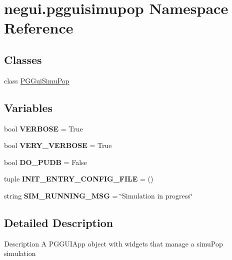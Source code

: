 \hypertarget{namespacenegui_1_1pgguisimupop}{}\section{negui.\+pgguisimupop Namespace Reference}
\label{namespacenegui_1_1pgguisimupop}
\subsection*{Classes}
\begin{DoxyCompactItemize}
\item 
class \hyperlink{classnegui_1_1pgguisimupop_1_1PGGuiSimuPop}{P\+G\+Gui\+Simu\+Pop}
\end{DoxyCompactItemize}
\subsection*{Variables}
\begin{DoxyCompactItemize}
\item 
bool {\bfseries V\+E\+R\+B\+O\+SE} = True\hypertarget{namespacenegui_1_1pgguisimupop_aab29eb6c6feb0d32b5d60b4eef930da9}{}\label{namespacenegui_1_1pgguisimupop_aab29eb6c6feb0d32b5d60b4eef930da9}

\item 
bool {\bfseries V\+E\+R\+Y\+\_\+\+V\+E\+R\+B\+O\+SE} = True\hypertarget{namespacenegui_1_1pgguisimupop_af283504b4edcb1ce9f987a021991a900}{}\label{namespacenegui_1_1pgguisimupop_af283504b4edcb1ce9f987a021991a900}

\item 
bool {\bfseries D\+O\+\_\+\+P\+U\+DB} = False\hypertarget{namespacenegui_1_1pgguisimupop_a7828b4058072779ad8f76eaa79a87952}{}\label{namespacenegui_1_1pgguisimupop_a7828b4058072779ad8f76eaa79a87952}

\item 
tuple {\bfseries I\+N\+I\+T\+\_\+\+E\+N\+T\+R\+Y\+\_\+\+C\+O\+N\+F\+I\+G\+\_\+\+F\+I\+LE} = ()\hypertarget{namespacenegui_1_1pgguisimupop_a0c62f73e78dad26e648483936e298140}{}\label{namespacenegui_1_1pgguisimupop_a0c62f73e78dad26e648483936e298140}

\item 
string {\bfseries S\+I\+M\+\_\+\+R\+U\+N\+N\+I\+N\+G\+\_\+\+M\+SG} = \char`\"{}Simulation in progress\char`\"{}\hypertarget{namespacenegui_1_1pgguisimupop_a8a725ff5a5dd2af5a91501e7c7ab5cc7}{}\label{namespacenegui_1_1pgguisimupop_a8a725ff5a5dd2af5a91501e7c7ab5cc7}

\end{DoxyCompactItemize}


\subsection{Detailed Description}
\begin{DoxyVerb}Description
A PGGUIApp object with widgets that manage a simuPop simulation
\end{DoxyVerb}
 